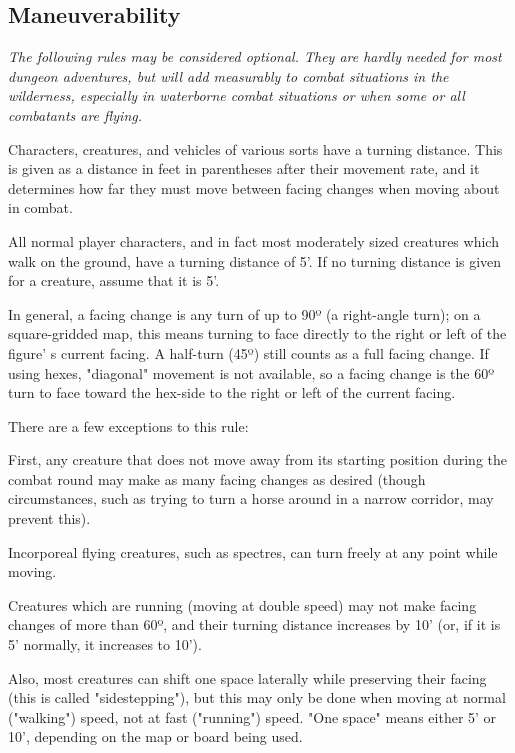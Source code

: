 \documentclass[a4paper,twoside,openany,10pt]{book}
\begin{document}
\begin{multicols}{2}
\subsection{Maneuverability}\label{maneuverability}

\textit{The following rules may be considered optional. They are hardly needed for most dungeon adventures, but will add measurably to combat situations in the wilderness, especially in waterborne combat situations or when some or all combatants are flying.}

Characters, creatures, and vehicles of various sorts have a turning distance. This is given as a distance in feet in parentheses after their movement rate, and it determines how far they must move between facing changes when moving about in combat.

All normal player characters, and in fact most moderately sized creatures which walk on the ground, have a turning distance of 5'. If no turning distance is given for a creature, assume that it is 5'.

In general, a facing change is any turn of up to 90º (a right-angle turn); on a square-gridded map, this means turning to face directly to the right or left of the figure' s current facing. A half-turn (45º) still counts as a full facing change. If using hexes, "diagonal" movement is not available, so a facing change is the 60º turn to face toward the hex-side to the right or left of the current facing.

There are a few exceptions to this rule: 

First, any creature that does not move away from its starting position during the combat round may make as many facing changes as desired (though circumstances, such as trying to turn a horse around in a narrow corridor, may prevent this).

Incorporeal flying creatures, such as spectres, can turn freely at any point while moving.

Creatures which are running (moving at double speed) may not make facing changes of more than 60º, and their turning distance increases by 10' (or, if it is 5' normally, it increases to 10').

Also, most creatures can shift one space laterally while preserving their facing (this is called "sidestepping"), but this may only be done when moving at normal ("walking") speed, not at fast ("running") speed. "One space" means either 5' or 10', depending on the map or board being used.


\end{multicols}
\end{document}
